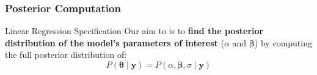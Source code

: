 \subsubsection{Posterior Computation}
\begin{frame}{Linear Regression Specification}
	Our aim to is to \textbf{find the posterior distribution of the
		model's parameters of interest} ($\alpha$ and $\boldsymbol{\beta}$)
	by computing the full posterior distribution of:
	$$
		P(\boldsymbol{\theta} \mid \boldsymbol{y}) = P(\alpha, \boldsymbol{\beta}, \sigma \mid \boldsymbol{y})
	$$
\end{frame}

